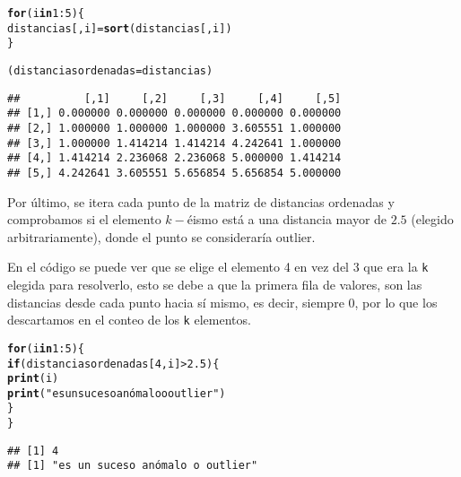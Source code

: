 \documentclass[12pt]{report}\usepackage[]{graphicx}\usepackage[dvipsnames]{xcolor}
\makeatletter
\newcommand{\hlnum}[1]{\textcolor[rgb]{0.686,0.059,0.569}{#1}}%
\newcommand{\hlstr}[1]{\textcolor[rgb]{0.192,0.494,0.8}{#1}}%
\newcommand{\hlopt}[1]{\textcolor[rgb]{0,0,0}{#1}}%
\newcommand{\hlstd}[1]{\textcolor[rgb]{0.345,0.345,0.345}{#1}}%
\newcommand{\hlkwa}[1]{\textcolor[rgb]{0.161,0.373,0.58}{\textbf{#1}}}%
\newcommand{\hlkwb}[1]{\textcolor[rgb]{0.69,0.353,0.396}{#1}}%
\newcommand{\hlkwd}[1]{\textcolor[rgb]{0.737,0.353,0.396}{\textbf{#1}}}%
\newenvironment{kframe}{%
 \def\at@end@of@kframe{}%
 \ifinner\ifhmode%
  \def\at@end@of@kframe{\end{minipage}}%
  \begin{minipage}{\columnwidth}%
 \fi\fi%
 \def\FrameCommand##1{\hskip\@totalleftmargin \hskip-\fboxsep
 \colorbox{shadecolor}{##1}\hskip-\fboxsep
     \hskip-\linewidth \hskip-\@totalleftmargin \hskip\columnwidth}%
 \MakeFramed {\advance\hsize-\width
   \@totalleftmargin\z@ \linewidth\hsize
   \@setminipage}}%
 {\par\unskip\endMakeFramed%
 \at@end@of@kframe}
\newenvironment{knitrout}{}{} %
\makeatother
\begin{document}
\begin{knitrout}
\color{fgcolor}\begin{kframe}
\begin{alltt}
\hlkwa{for} \hlstd{(i} \hlkwa{in} \hlnum{1}\hlopt{:}\hlnum{5}\hlstd{) \{}
        \hlstd{distancias[,i]} \hlkwb{=} \hlkwd{sort}\hlstd{(distancias[,i])}
\hlstd{\}}

\hlstd{(distanciasordenadas}\hlkwb{=}\hlstd{distancias)}
\end{alltt}
\begin{verbatim}
##          [,1]     [,2]     [,3]     [,4]     [,5]
## [1,] 0.000000 0.000000 0.000000 0.000000 0.000000
## [2,] 1.000000 1.000000 1.000000 3.605551 1.000000
## [3,] 1.000000 1.414214 1.414214 4.242641 1.000000
## [4,] 1.414214 2.236068 2.236068 5.000000 1.414214
## [5,] 4.242641 3.605551 5.656854 5.656854 5.000000
\end{verbatim}
\end{kframe}
\end{knitrout}
					
					Por último, se itera cada punto de la matriz de distancias ordenadas y comprobamos si el elemento $k-$éismo está a una distancia mayor de $2.5$ (elegido arbitrariamente), donde el punto se consideraría outlier.
					
					En el código se puede ver que se elige el elemento 4 en vez del 3 que era la \texttt{k} elegida para resolverlo, esto se debe a que la primera fila de valores, son las distancias desde cada punto hacia sí mismo, es decir, siempre 0, por lo que los descartamos en el conteo de los \texttt{k} elementos.
					
\begin{knitrout}
\color{fgcolor}\begin{kframe}
\begin{alltt}
\hlkwa{for} \hlstd{(i} \hlkwa{in} \hlnum{1}\hlopt{:}\hlnum{5}\hlstd{) \{}
        \hlkwa{if} \hlstd{(distanciasordenadas[}\hlnum{4}\hlstd{,i]} \hlopt{>} \hlnum{2.5}\hlstd{) \{}
                \hlkwd{print}\hlstd{(i)}
                \hlkwd{print}\hlstd{(}\hlstr{"es un suceso anómalo o outlier"}\hlstd{)}
        \hlstd{\}}
\hlstd{\}}
\end{alltt}
\begin{verbatim}
## [1] 4
## [1] "es un suceso anómalo o outlier"
\end{verbatim}
\end{kframe}
\end{knitrout}
					
\end{document}
